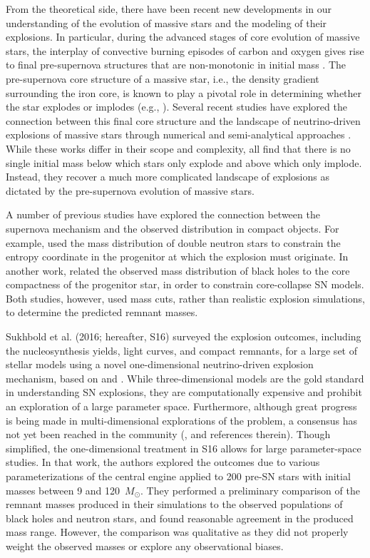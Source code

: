 \documentclass[]{emulateapj}
\newcommand{\Ms}{M_{\odot}}
\begin{document}
From the theoretical side, there have been recent new developments in our understanding of the evolution of massive stars and the modeling of their explosions. In particular, during the advanced stages of core evolution of massive stars, the interplay of convective burning episodes of carbon and oxygen gives rise to final pre-supernova structures that are non-monotonic in  initial mass \citep{Sukhbold2014}. The pre-supernova core structure of a massive star, i.e., the density gradient surrounding the iron core, is known to play a pivotal role in determining whether the star explodes or implodes (e.g., \citealt{Burrows1995}). Several recent studies have explored the connection between this final core structure and the landscape of neutrino-driven explosions of massive stars through numerical and semi-analytical approaches \citep{OConnor2011, Ugliano2012, Pejcha2015, Ertl2016, Sukhbold2016, Muller2016, Murphy2017}. While these works differ in their scope and complexity, all find that there is no single initial mass below which stars only explode and above which only implode. Instead, they recover a much more complicated landscape of explosions as dictated by the pre-supernova evolution of massive stars.

A number of previous studies have explored the connection between the supernova mechanism and the observed distribution in compact objects. For example, \citet{Pejcha2012} used the mass distribution of double neutron stars to constrain the entropy coordinate in the progenitor at which the explosion must originate. In another work, \citet{Kochanek2014} related the observed mass distribution of black holes to the core compactness of the progenitor star, in order to constrain core-collapse SN models. Both studies, however, used mass cuts, rather than realistic explosion simulations, to determine the predicted remnant masses. 

Sukhbold et al. (2016; hereafter, S16) surveyed the explosion outcomes, including the nucleosynthesis yields, light curves, and compact remnants, for a large set of stellar models using a novel one-dimensional neutrino-driven explosion mechanism, based on \citet{Ugliano2012} and \citet{Ertl2016}. While three-dimensional models are the gold standard in understanding SN explosions, they are computationally expensive and prohibit an exploration of a large parameter space. Furthermore, although great progress is being made in multi-dimensional explorations of the problem, a consensus has not yet been reached in the community (\citealt{Janka2016}, and references therein). Though simplified, the one-dimensional treatment in S16 allows for large parameter-space studies. In that work, the authors explored the outcomes due to various parameterizations of the central engine applied to 200 pre-SN stars with initial masses between 9 and 120~$\Ms$. They performed a preliminary comparison of the remnant masses produced in their simulations to the observed populations of black holes and neutron stars, and found reasonable agreement in the produced mass range. However, the comparison was qualitative as they did not properly weight the observed masses or explore any observational biases. 
\end{document}

